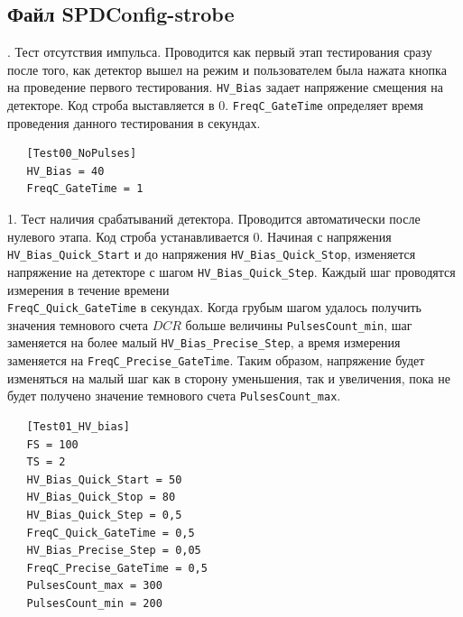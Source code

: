 \documentclass[12pt]{article}
\begin{document}
\subsection{Файл SPDConfig-strobe}


. Тест отсутствия импульса. Проводится как первый этап тестирования сразу после того, как детектор вышел на режим и пользователем была нажата кнопка на проведение первого тестирования. \verb|HV_Bias| задает напряжение смещения на детекторе. Код строба выставляется в 0.  \verb|FreqC_GateTime| определяет время проведения данного тестирования в секундах.

\begin{lstlisting}
   [Test00_NoPulses]
   HV_Bias = 40
   FreqC_GateTime = 1
\end{lstlisting}

1. Тест наличия срабатываний детектора. Проводится автоматически после нулевого этапа. Код строба устанавливается 0. Начиная с напряжения \verb|HV_Bias_Quick_Start| и до напряжения \verb|HV_Bias_Quick_Stop|, изменяется напряжение на детекторе с шагом \verb|HV_Bias_Quick_Step|. Каждый шаг проводятся измерения в течение времени \\ \verb|FreqC_Quick_GateTime| в секундах. Когда грубым шагом удалось получить значения темнового счета $DCR$ больше величины \verb|PulsesCount_min|, шаг заменяется на более малый \verb|HV_Bias_Precise_Step|, а время измерения заменяется на \verb|FreqC_Precise_GateTime|. Таким образом, напряжение будет изменяться на малый шаг как в сторону уменьшения, так и увеличения, пока не будет получено значение темнового счета  \verb|PulsesCount_max|. 

\begin{lstlisting}
   [Test01_HV_bias]
   FS = 100
   TS = 2
   HV_Bias_Quick_Start = 50
   HV_Bias_Quick_Stop = 80
   HV_Bias_Quick_Step = 0,5
   FreqC_Quick_GateTime = 0,5
   HV_Bias_Precise_Step = 0,05
   FreqC_Precise_GateTime = 0,5
   PulsesCount_max = 300
   PulsesCount_min = 200
\end{lstlisting}
\end{document}
